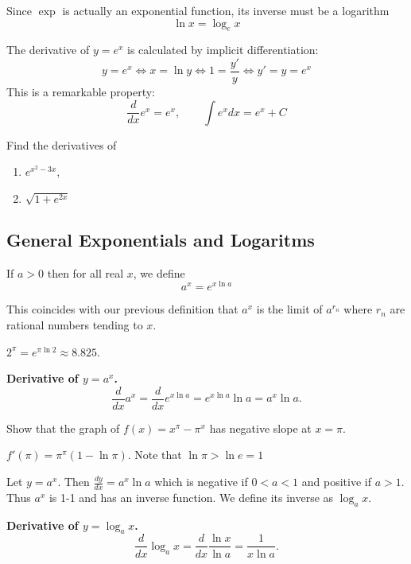 \documentclass[../calc1-main.tex]{subfiles}
\begin{document}

  Since $\exp$ is actually an exponential function, its inverse must be a logarithm
  \[
    \ln x = \log_e x
  \]

  The derivative of $y = e^x$ is calculated by implicit differentiation:
  \[
    y = e^x \iff
    x = \ln y \iff
    1 = \frac{y'}{y} \iff
    y' = y = e^x
  \]
  This is a remarkable property:
  \[
    \frac{d}{dx} e^x = e^x, \qquad \int e^x dx = e^x + C
  \]

  \begin{example}
    Find the derivatives of
    \begin{enumerate}
      \item $e^{x^2-3x}$,
      \item $\sqrt{1+e^{2x}}$
    \end{enumerate}
  \end{example}

  \subsection*{General Exponentials and Logaritms}
  \begin{definition}
    If $a>0$ then for all real $x$, we define
    \[
      a^x = e^{x \ln a}
    \]
  \end{definition}
  This coincides with our previous definition that $a^x$ is the limit of $a^{r_n}$ where $r_n$ are rational numbers tending to $x$.

  \begin{example}
    $2^{\pi} = e^{\pi \ln 2} \approx 8.825$.
  \end{example}

  \textbf{Derivative of $y=a^x$.}
  \[
    \frac{d}{dx} a^x = \frac{d}{dx} e^{x \ln a} = e^{x \ln a} \ln a = a^x \ln a.
  \]

  \begin{example}
    Show that the graph of $f(x) = x^{\pi} - \pi^x$ has negative slope at $x = \pi$.
  \end{example}
  \begin{solution}
    $f'(\pi) = \pi^{\pi} (1- \ln \pi)$. Note that $\ln \pi > \ln e = 1$
  \end{solution}

  \begin{definition}
    Let $y = a^x$. Then $\frac{dy}{dx} = a^x \ln a$ which is negative if $0<a<1$ and positive if $a>1$. Thus $a^x$ is 1-1 and has an inverse function. We define its inverse as $\log_a x$.
  \end{definition}
  \textbf{Derivative of $y=\log_a x$.}
  \[
    \frac{d}{dx} \log_a x = \frac{d}{dx} \frac{\ln x}{\ln a} = \frac{1}{x \ln a}.
  \]
\end{document}
